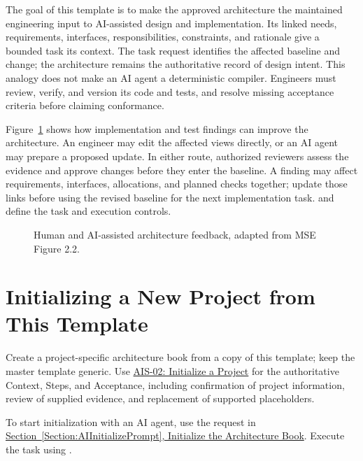 The goal of this template is to make the approved architecture the maintained
engineering input to AI-assisted design and implementation. Its linked needs,
requirements, interfaces, responsibilities, constraints, and rationale give a
bounded task its context. The task request identifies the affected baseline and
change; the architecture remains the authoritative record of design intent.
This analogy does not make an AI agent a deterministic compiler. Engineers must
review, verify, and version its code and tests, and resolve missing acceptance
criteria before claiming conformance.

Figure~\ref{Figure:ArchitectureUpdateFeedback} shows how implementation and
test findings can improve the architecture. An engineer may edit the affected
views directly, or an AI agent may prepare a proposed update. In either route,
authorized reviewers assess the evidence and approve changes before they enter
the baseline. A finding may affect requirements, interfaces, allocations, and
planned checks together; update those links before using the revised baseline
for the next implementation task.  and
 define the task and execution controls.

\begin{figure}[htbp]
\centering
\resizebox{\textwidth}{!}{}
\caption{Human and AI-assisted architecture feedback, adapted from MSE Figure 2.2.}
\label{Figure:ArchitectureUpdateFeedback}
\end{figure}

\section{Initializing a New Project from This Template}
\label{Section:InitializeNewProject}
Create a project-specific architecture book from a copy of this template;
keep the master template generic. Use
\hyperref[Skill:AIS-02]{AIS-02: Initialize a Project} for the authoritative
Context, Steps, and Acceptance, including confirmation of project information,
review of supplied evidence, and replacement of supported placeholders.

To start initialization with an AI agent, use the request in
\hyperref[Section:AIInitializePrompt]{Section~\ref{Section:AIInitializePrompt},
Initialize the Architecture Book}. Execute the task using
.

